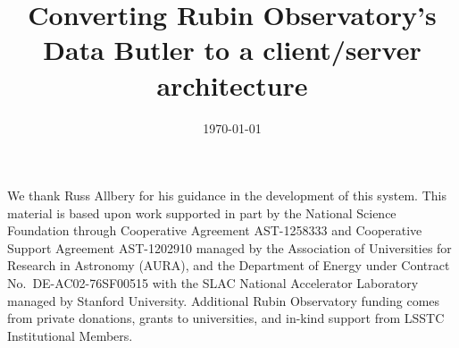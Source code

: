 \documentclass[]{spie}
\begin{document}

\date{\today}
\title{Converting Rubin Observatory's Data Butler to a client/server architecture}

\maketitle





\acknowledgments

We thank Russ Allbery for his guidance in the development of this system.
This material is based upon work supported in part by the National Science Foundation through Cooperative Agreement AST-1258333 and Cooperative Support Agreement AST-1202910 managed by the Association of Universities for Research in Astronomy (AURA), and the Department of Energy under Contract No.\ DE-AC02-76SF00515 with the SLAC National Accelerator Laboratory managed by Stanford University.
Additional Rubin Observatory funding comes from private donations, grants to universities, and in-kind support from LSSTC Institutional Members.



\end{document}
